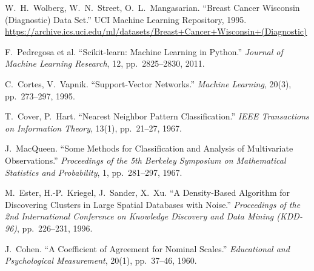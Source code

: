 \documentclass[12pt,a4paper]{article}
\begin{document}
\begin{enumerate}[leftmargin=2em,label={[\arabic*]}]
  \item W.~H.~Wolberg, W.~N.~Street, O.~L.~Mangasarian.
        ``Breast Cancer Wisconsin (Diagnostic) Data Set.''
        UCI Machine Learning Repository, 1995.
        \url{https://archive.ics.uci.edu/ml/datasets/Breast+Cancer+Wisconsin+(Diagnostic)}

  \item F.~Pedregosa et al.
        ``Scikit-learn: Machine Learning in Python.''
        \textit{Journal of Machine Learning Research}, 12, pp.~2825--2830, 2011.

  \item C.~Cortes, V.~Vapnik.
        ``Support-Vector Networks.''
        \textit{Machine Learning}, 20(3), pp.~273--297, 1995.

  \item T.~Cover, P.~Hart.
        ``Nearest Neighbor Pattern Classification.''
        \textit{IEEE Transactions on Information Theory}, 13(1), pp.~21--27, 1967.

  \item J.~MacQueen.
        ``Some Methods for Classification and Analysis of Multivariate Observations.''
        \textit{Proceedings of the 5th Berkeley Symposium on Mathematical Statistics
        and Probability}, 1, pp.~281--297, 1967.

  \item M.~Ester, H.-P.~Kriegel, J.~Sander, X.~Xu.
        ``A Density-Based Algorithm for Discovering Clusters in Large Spatial Databases
        with Noise.''
        \textit{Proceedings of the 2nd International Conference on Knowledge Discovery
        and Data Mining (KDD-96)}, pp.~226--231, 1996.

  \item J.~Cohen.
        ``A Coefficient of Agreement for Nominal Scales.''
        \textit{Educational and Psychological Measurement}, 20(1), pp.~37--46, 1960.
\end{enumerate}
\end{document}
